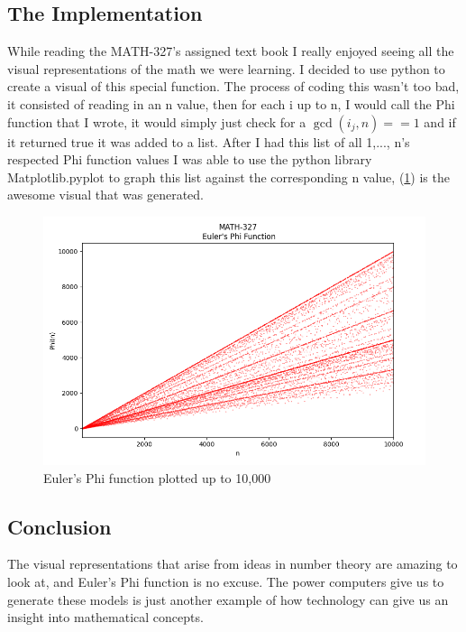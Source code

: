 \documentclass{article}
\begin{document}
\subsection{The Implementation}
While reading the MATH-327's assigned text book I really enjoyed seeing all the visual representations of the math we were learning. 
I decided to use python to create a visual of this special function. The process of coding this wasn't too bad, it consisted of reading in
an n value, then for each i up to n, I would call the Phi function that I wrote, it would simply just check for a $\gcd(i_j, n) == 1$ and if 
it returned true it was added to a list. After I had this list of all 1,..., n's respected Phi function values I was able to use the python library
Matplotlib.pyplot to graph this list against the corresponding n value, (\ref{fig:PhiPlot}) is the awesome visual that was generated.\\
\begin{figure}
  \centering
  \includegraphics[scale=.4]{PHI.png}
  \caption{Euler's Phi function plotted up to 10,000}
  \label{fig:PhiPlot}
\end{figure}
\subsection{Conclusion}
The visual representations that arise from ideas in number theory are amazing to look at, and Euler's Phi function is no excuse. The power computers 
give us to generate these models is just another example of how technology can give us an insight into mathematical concepts.
\end{document}
